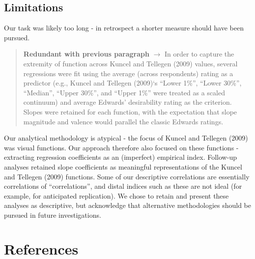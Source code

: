 \documentclass[
  ,jou]{apa6}
\begin{document}
\hypertarget{limitations}{%
\subsection{Limitations}\label{limitations}}

Our task was likely too long - in retrospect a shorter measure should have been pursued.

\begin{quote}
\textbf{Redundant with previous paragraph} \(\rightarrow\) In order to capture the extremity of function across Kuncel and Tellegen (2009) values, several regressions were fit using the average (across respondents) rating as a predictor (e.g., Kuncel and Tellegen (2009)`s ``Lower 1\%'', ``Lower 30\%'', ``Median'', ``Upper 30\%'', and ``Upper 1\%'' were treated as a scaled continuum) and average Edwards' desirability rating as the criterion. Slopes were retained for each function, with the expectation that slope magnitude and valence would parallel the classic Edwards ratings.
\end{quote}

Our analytical methodology is atypical - the focus of Kuncel and Tellegen (2009) was visual functions. Our approach therefore also focused on these functions - extracting regression coefficients as an (imperfect) empirical index. Follow-up analyses retained slope coefficients as meaningful representations of the Kuncel and Tellegen (2009) functions. Some of our descriptive correlations are essentially correlations of ``correlations'', and distal indices such as these are not ideal (for example, for anticipated replication). We chose to retain and present these analyses as descriptive, but acknowledge that alternative methodologies should be pursued in future investigations.

\hypertarget{references}{%
\section{References}\label{references}}

\begingroup
\setlength{\parindent}{-0.5in}
\setlength{\leftskip}{0.5in}
\end{document}
